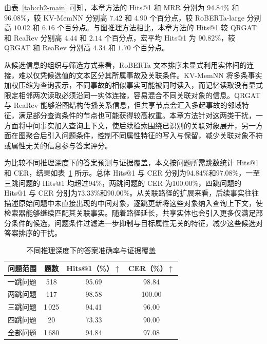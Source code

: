由表~\ref{tab:ch2-main} 可知，本章方法的 Hits@1 和 MRR 分别为 $94.84\%$ 和 $96.08\%$，较 KV-MemNN 分别高 $7.42$ 和 $4.90$ 个百分点，较 RoBERTa-large 分别高 $10.02$ 和 $6.16$ 个百分点。与图推理方法相比，本章方法的 Hits@1 较 QRGAT 和 ReaRev 分别高 $4.44$ 和 $2.14$ 个百分点，宏平均 Hits@1 为 $90.82\%$，较 QRGAT 和 ReaRev 分别高 $4.34$ 和 $1.70$ 个百分点。

从候选信息的组织与筛选方式来看，RoBERTa 文本排序未显式利用实体间的连接，难以仅凭候选值的文本区分其所属事故及关联条件。KV-MemNN 将多条事实加权压缩为查询表示，不同事故的相似事实可能被同时读入，而记忆读取没有显式限定相邻两次读取必须沿同一实体连接，容易混合不同关联对象的信息。QRGAT 与 ReaRev 能够沿图结构传播关系信息，但共享节点会汇入多起事故的邻域特征，满足部分查询条件的节点也可能获得较高权重。本章方法针对这两类干扰，一方面将中间事实加入查询上下文，使后续检索围绕已识别的关联对象展开，另一方面在图聚合后引入问题条件，控制不同属性特征的写入与保留，减少关联对象不符或属性无关的信息参与答案评分。


为比较不同推理深度下的答案预测与证据覆盖，本文按问题所需跳数统计 Hits@1 和 CER，结果如表~\ref{tab:ch2-supported} 所示。总体 Hits@1 与 CER 分别为94.84\%和97.08\%，一至三跳问题的 Hits@1 均超过94\%，两跳问题的 CER 为100.00\%，四跳问题的 Hits@1 与 CER 分别为73.33\%和90.00\%。从关联路径的扩展来看，后续事实往往描述原始问题中未直接出现的中间对象，逐跳更新将这些对象纳入查询上下文，使检索器能够继续匹配其关联事实。随着路径延长，共享实体也会引入更多仅满足部分条件的候选，问题条件过滤进一步抑制与目标属性无关的特征，减少这些候选对答案排序的干扰。

\begin{table}[htbp]
  \centering
  \caption{不同推理深度下的答案准确率与证据覆盖}
  \label{tab:ch2-supported}
  \fontsize{10.5bp}{13.65bp}\selectfont
  \begin{tabular*}{\linewidth}{@{\extracolsep{\fill}}lccc@{}}
    \toprule
    问题范围 & 题数 & Hits@1（\%）$\uparrow$ & CER（\%）$\uparrow$ \\
    \midrule
    一跳问题 & 518 & 95.69 & 98.84 \\
    两跳问题 & 117 & 98.58 & 100.00 \\
    三跳问题 & 1\,025 & 94.41 & 96.00 \\
    四跳问题 & 20 & 73.33 & 90.00 \\
    \midrule
    全部问题 & 1\,680 & 94.84 & 97.08 \\
    \bottomrule
  \end{tabular*}
\end{table}

